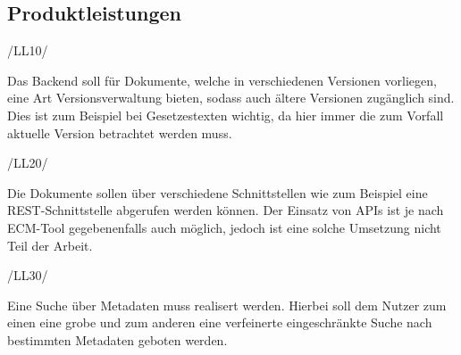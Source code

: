 \subsection{Produktleistungen} \label{Produktleistungen}
\begin{minipage}{3cm}
/LL10/
\end{minipage}
\begin{minipage}{13cm}
Das Backend soll f\"ur Dokumente, welche in verschiedenen Versionen vorliegen, eine Art Versionsverwaltung bieten, sodass auch \"altere Versionen zug\"anglich sind. Dies ist zum Beispiel bei Gesetzestexten wichtig, da hier immer die zum Vorfall aktuelle Version betrachtet werden muss.\\
\end{minipage}
\begin{minipage}{3cm}
/LL20/
\end{minipage}
\begin{minipage}{13cm}
Die Dokumente sollen \"uber verschiedene Schnittstellen wie zum Beispiel eine \ac{REST}-Schnittstelle abgerufen werden k\"onnen. Der Einsatz von \ac{API}s ist je nach \ac{ECM}-Tool gegebenenfalls auch m\"oglich, jedoch ist eine solche Umsetzung nicht Teil der Arbeit. \cite{Wiki_REST}\\
\end{minipage}
\begin{minipage}{3cm}
/LL30/
\end{minipage}
\begin{minipage}{13cm}
Eine Suche \"uber Metadaten muss realisert werden. Hierbei soll dem Nutzer zum einen eine grobe und zum anderen eine verfeinerte eingeschr\"ankte Suche nach bestimmten Metadaten geboten werden.\\
\end{minipage}